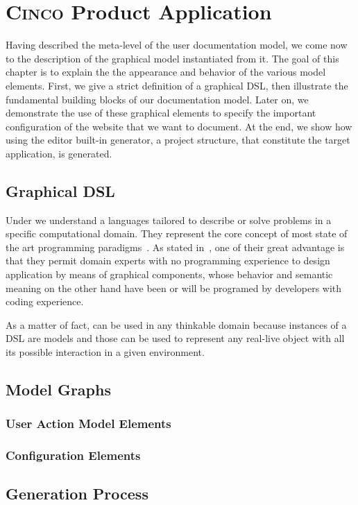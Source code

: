 \chapter{\textsc{Cinco} Product Application}\label{ch:CP}

Having described the meta-level of the user documentation model, we come now to the description of the graphical model instantiated from it. The goal of this chapter is to explain the the appearance and behavior of the various model elements. First, we give a strict definition of a graphical DSL, then illustrate the fundamental building blocks of our documentation model. Later on, we demonstrate the use of these graphical elements to specify the important configuration of the website that we want to document. At the end, we show how using the editor built-in generator, a project structure, that constitute the target application, is generated.

\section{Graphical DSL}\label{sec:gDSL}

Under  we understand a languages tailored to describe or solve problems in a specific computational domain. They represent the core concept of most state of the art programming paradigms~\cite{perez-et_al}. As stated in~\cite{Naujokat2018}, one of their great advantage is that they permit domain experts with no programming experience to design application by means of graphical components, whose behavior and semantic meaning on the other hand have been or will be programed by developers with coding experience.

As a matter of fact,  can be used in any thinkable domain because instances of a DSL are models and those can be used to represent any real-live object with all its possible interaction in a given environment.

\section{Model Graphs}\label{sec:ModElem}


\subsection{User Action Model Elements}\label{sec:FuncElem}


\subsection{Configuration Elements}\label{sec:ConfElem}


\section{Generation Process}\label{sec:GenProcess}


